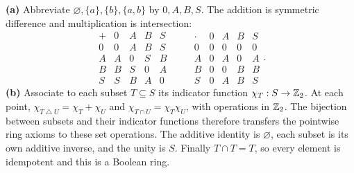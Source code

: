 \textbf{(a)} Abbreviate $\varnothing,\{a\},\{b\},\{a,b\}$ by $0,A,B,S$. The addition is symmetric difference and multiplication is intersection:
\[
\begin{array}{c|cccc}+&0&A&B&S\\\hline
0&0&A&B&S\\ A&A&0&S&B\\ B&B&S&0&A\\ S&S&B&A&0
\end{array}
\qquad
\begin{array}{c|cccc}\cdot&0&A&B&S\\\hline
0&0&0&0&0\\ A&0&A&0&A\\ B&0&0&B&B\\ S&0&A&B&S
\end{array}.
\]
\textbf{(b)} Associate to each subset $T\subseteq S$ its indicator function $\chi_T:S\to\mathbb{Z}_2$. At each point, $\chi_{T\mathbin{\triangle}U}=\chi_T+\chi_U$ and $\chi_{T\cap U}=\chi_T\chi_U$, with operations in $\mathbb{Z}_2$. The bijection between subsets and their indicator functions therefore transfers the pointwise ring axioms to these set operations. The additive identity is $\varnothing$, each subset is its own additive inverse, and the unity is $S$. Finally $T\cap T=T$, so every element is idempotent and this is a Boolean ring.

